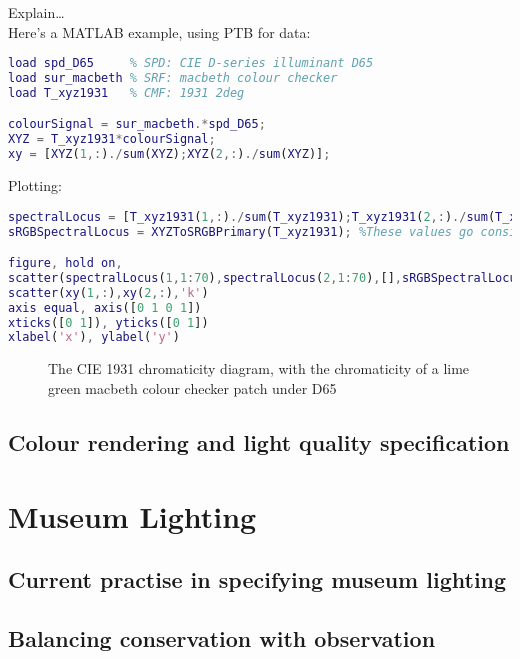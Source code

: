 Explain\dots \\
Here's a \gls{MATLAB} example, using \gls{PTB} for data:

\begin{lstlisting}[language=MATLAB]
load spd_D65     % SPD: CIE D-series illuminant D65
load sur_macbeth % SRF: macbeth colour checker
load T_xyz1931   % CMF: 1931 2deg 

colourSignal = sur_macbeth.*spd_D65;
XYZ = T_xyz1931*colourSignal;
xy = [XYZ(1,:)./sum(XYZ);XYZ(2,:)./sum(XYZ)];
\end{lstlisting}

Plotting: 

\begin{lstlisting}[language=MATLAB]
spectralLocus = [T_xyz1931(1,:)./sum(T_xyz1931);T_xyz1931(2,:)./sum(T_xyz1931)];
sRGBSpectralLocus = XYZToSRGBPrimary(T_xyz1931); %These values go considerably out of gamut, but we only want rough values to orient ourselves

figure, hold on, 
scatter(spectralLocus(1,1:70),spectralLocus(2,1:70),[],sRGBSpectralLocus(:,1:70)','filled')
scatter(xy(1,:),xy(2,:),'k')
axis equal, axis([0 1 0 1])
xticks([0 1]), yticks([0 1])
xlabel('x'), ylabel('y')
\end{lstlisting}

\begin{figure}[htbp]
\caption{The CIE 1931 chromaticity diagram, with the chromaticity of a lime green macbeth colour checker patch under D65}
\label{fig:1931}
\end{figure}







\subsection{Colour rendering and light quality specification}

\section{Museum Lighting}
\subsection{Current practise in specifying museum lighting}
\subsection{Balancing conservation with observation}
